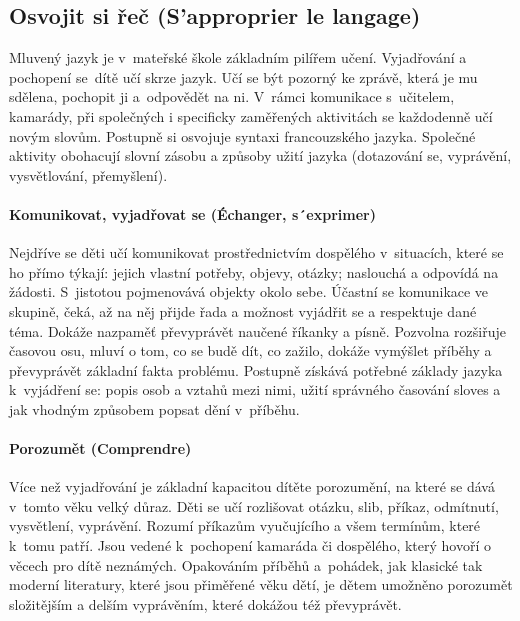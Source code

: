 		\subsection{Osvojit si řeč (S'approprier le langage)}
			Mluvený jazyk je v mateřské škole základním pilířem učení. Vyjadřování a pochopení se dítě učí skrze jazyk. Učí se být pozorný ke zprávě, která je mu sdělena, pochopit ji a odpovědět na ni. V rámci komunikace s učitelem, kamarády, při společných i specificky zaměřených aktivitách se každodenně učí novým slovům. Postupně si osvojuje syntaxi francouzského jazyka. Společné aktivity obohacují slovní zásobu a způsoby užití jazyka (dotazování se, vyprávění, vysvětlování, přemyšlení).

			\paragraph{Komunikovat, vyjadřovat se (Échanger, s´exprimer)}
			\break
			Nejdříve se děti učí komunikovat prostřednictvím dospělého v situacích, které se ho přímo týkají: jejich vlastní potřeby, objevy, otázky; naslouchá a odpovídá na žádosti. S jistotou pojmenovává objekty okolo sebe. Účastní se komunikace ve skupině, čeká, až na něj přijde řada a možnost vyjádřit se a respektuje dané téma. Dokáže nazpaměť převyprávět naučené říkanky a písně. Pozvolna rozšiřuje časovou osu, mluví o tom, co se budě dít, co zažilo, dokáže vymýšlet příběhy a převyprávět základní fakta problému. Postupně získává potřebné základy jazyka k vyjádření se: popis osob a vztahů mezi nimi, užití správného časování sloves a jak vhodným způsobem popsat dění v příběhu.

			\paragraph{Porozumět (Comprendre)}
			Více než vyjadřování je základní kapacitou dítěte porozumění, na které se dává v tomto věku velký důraz.
			Děti se učí rozlišovat otázku, slib, příkaz, odmítnutí, vysvětlení, vyprávění. Rozumí příkazům vyučujícího a všem termínům, které k tomu patří. Jsou vedené k pochopení kamaráda či dospělého, který hovoří o věcech pro dítě neznámých. Opakováním příběhů a pohádek, jak klasické tak moderní literatury, které jsou přiměřené věku dětí, je dětem umožněno porozumět složitějším a delším vyprávěním, které dokážou též převyprávět. 

